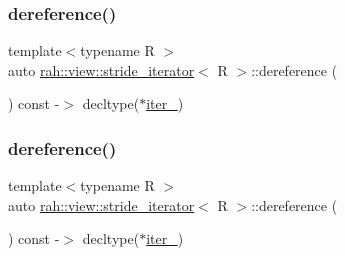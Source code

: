 \subsubsection{\texorpdfstring{dereference()}{dereference()}\hspace{0.1cm}{\footnotesize\ttfamily [1/2]}}
{\footnotesize\ttfamily template$<$typename R $>$ \\
auto \mbox{\hyperlink{structrah_1_1view_1_1stride__iterator}{rah\+::view\+::stride\+\_\+iterator}}$<$ R $>$\+::dereference (\begin{DoxyParamCaption}{ }\end{DoxyParamCaption}) const -\/$>$ decltype($\ast$\mbox{\hyperlink{structrah_1_1view_1_1stride__iterator_ab6d43c096bd4561c737cb7f2b983afb3}{iter\+\_\+}}) \hspace{0.3cm}{\ttfamily [inline]}}

\mbox{\label{structrah_1_1view_1_1stride__iterator_a8db124e5f1f4260387c40336712b1566}} 
\subsubsection{\texorpdfstring{dereference()}{dereference()}\hspace{0.1cm}{\footnotesize\ttfamily [2/2]}}
{\footnotesize\ttfamily template$<$typename R $>$ \\
auto \mbox{\hyperlink{structrah_1_1view_1_1stride__iterator}{rah\+::view\+::stride\+\_\+iterator}}$<$ R $>$\+::dereference (\begin{DoxyParamCaption}{ }\end{DoxyParamCaption}) const -\/$>$ decltype($\ast$\mbox{\hyperlink{structrah_1_1view_1_1stride__iterator_ab6d43c096bd4561c737cb7f2b983afb3}{iter\+\_\+}}) \hspace{0.3cm}{\ttfamily [inline]}}

\mbox{\label{structrah_1_1view_1_1stride__iterator_ad30be3983aec3fab52efb32a1a461056}} 
